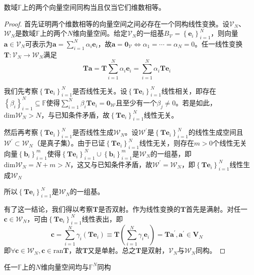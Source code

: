 \documentclass[main.tex]{subfiles}
\begin{document}
\begin{theorem}\label{thm:II.4.8}
数域$\mathbb{F}$上的两个向量空间同构当且仅当它们维数相等。
\end{theorem}
\begin{proof}
首先证明两个维数相等的向量空间之间必存在一个同构线性变换。设$\mathcal{V}_N$、$\mathcal{W}_N$是数域$\mathbb{F}$上的两个$N$维向量空间。给定$\mathcal{V}_N$的一组基$B_\mathcal{V}=\left\{\mathbf{e}_i\right\}_{i=1}^N$，则向量$\mathbf{a}\in\mathcal{V}_N$可表示为$\mathbf{a}=\sum_{i=1}^N\alpha_i\mathbf{e}_i$，故$\mathbf{a}=\mathbf{0}_\mathcal{V}\Leftrightarrow\alpha_1=\cdots=\alpha_N=0$。任一线性变换$\mathbf{T}:\mathcal{V}_N\rightarrow\mathcal{W}_N$满足
\[\mathbf{Ta}=\mathbf{T}\sum_{i=1}^N\alpha_i\mathbf{e}_i=\sum_{i=1}^N\alpha_i\mathbf{Te}_i\]

我们先考察$\left\{\mathbf{Te}_i\right\}_{i=1}^N$是否线性无关。设$\left\{\mathbf{Te}_i\right\}_{i=1}^N$线性相关，即存在$\left\{\beta_i\right\}_{i=1}^N\subseteq\mathbb{F}$使得$\sum_{i=1}^N\beta_i\mathbf{Te}_i=\mathbf{0}_\mathcal{W}$且至少有一个$\beta_j\neq0$。若是如此，$\mathrm{dim}\mathcal{W}_N>N$，与已知条件矛盾，故$\left\{\mathbf{Te}_i\right\}_{i=1}^N$线性无关。

然后再考察$\left\{\mathbf{Te}_i\right\}_{i=1}^N$是否线性生成$\mathcal{W}_N$。设$\mathcal{W}^\prime$是$\left\{\mathbf{Te}_i\right\}_{i=1}^N$的线性生成空间且$\mathcal{W}^\prime\subset\mathcal{W}_N$（是真子集）。由于已证$\left\{\mathbf{Te}_i\right\}_{i=1}^N$线性无关，则存在$m>0$个线性无关向量$\left\{\mathbf{b}_i\right\}_{i=1}^m$使得$\left\{\mathbf{Te}_i\right\}_{i=1}^N\cup\left\{\mathbf{b}_i\right\}_{i=1}^m$是$\mathcal{W}_N$的一组基，即$\mathrm{dim}\mathcal{W}_N=N+m>N$，这又与已知条件矛盾，故$\mathcal{W}^\prime=\mathcal{W}_N$，即$\left\{\mathbf{Te}_i\right\}_{i=1}^N$线性生成$\mathcal{W}_N$

所以$\left\{\mathbf{Te}_i\right\}_{i=1}^N$是$\mathcal{W}_N$的一组基。

有了这一结论，我们得以考察$\mathbf{T}$是否双射。作为线性变换的$\mathbf{T}$首先是满射。对任一$\mathbf{c}\in\mathcal{W}_N$，可由$\left\{\mathbf{Te}_i\right\}_{i=1}^N$线性表出，即
\[\mathbf{c}=\sum_{i=1}^N\gamma_i\left(\mathbf{Te}_i\right)\equiv\mathbf{T}\left(\sum_{i=1}^N\gamma_i\mathbf{e}_i\right)=\mathbf{Ta}^\prime,\mathbf{a}^\prime\in\mathbf{V}_N\]
即$\forall\mathbf{c}\in\mathcal{W}_N,\mathbf{c}\in\mathrm{ran}\mathbf{T}$，故$\mathbf{T}$又是单射。总之$\mathbf{T}$是双射，$\mathcal{V}_N$与$\mathcal{W}_N$同构。
\end{proof}

\begin{corollary}
任一$\mathbb{F}$上的$N$维向量空间均与$\mathbb{F}^N$同构
\end{corollary}
\end{document}
